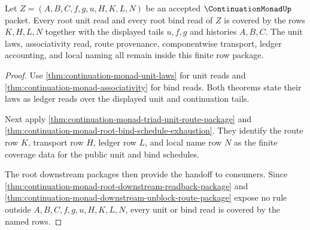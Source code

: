 \begin{theorem}
\label{thm:continuation-monad-root-continuation-rule-coverage}
Let $Z=(A,B,C,f,g,u,H,K,L,N)$ be an accepted $\ContinuationMonadUp$ packet. Every root unit read and every root bind read of $Z$ is covered by the rows $K,H,L,N$ together with the displayed tails $u,f,g$ and histories $A,B,C$. The unit laws, associativity read, route provenance, componentwise transport, ledger accounting, and local naming all remain inside this finite row package.
\end{theorem}
\begin{proof}
Use \autoref{thm:continuation-monad-unit-laws} for unit reads and \autoref{thm:continuation-monad-associativity} for bind reads. Both theorems state their laws as ledger reads over the displayed unit and continuation tails.

Next apply \autoref{thm:continuation-monad-triad-unit-route-package} and \autoref{thm:continuation-monad-root-bind-schedule-exhaustion}. They identify the route row $K$, transport row $H$, ledger row $L$, and local name row $N$ as the finite coverage data for the public unit and bind schedules.

The root downstream packages then provide the handoff to consumers. Since \autoref{thm:continuation-monad-root-downstream-readback-package} and \autoref{thm:continuation-monad-downstream-unblock-route-package} expose no rule outside $A,B,C,f,g,u,H,K,L,N$, every unit or bind read is covered by the named rows.
\end{proof}


